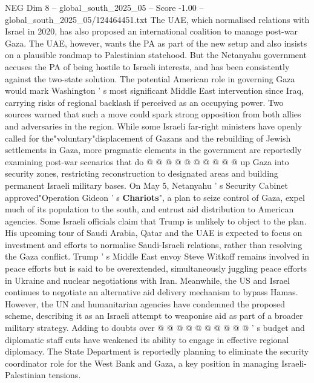 \begin{textsample}{NEG Dim 8 – global\_south\_2025\_05 – Score -1.00 – global\_south\_2025\_05/124464451.txt}
The UAE, which normalised relations with Israel in 2020, has also proposed an international coalition to manage post-war Gaza.
The UAE, however, wants the PA as part of the new setup and also insists on a plausible roadmap to Palestinian statehood.
But the Netanyahu government accuses the PA of being hostile to Israeli interests, and has been consistently against the two-state solution.
The potential American role in governing Gaza would mark Washington ' s most significant Middle East intervention since Iraq, carrying risks of regional backlash if perceived as an occupying power.
Two sources warned that such a move could spark strong opposition from both allies and adversaries in the region.
While some Israeli far-right ministers have openly called for the"voluntary"displacement of Gazans and the rebuilding of Jewish settlements in Gaza, more pragmatic elements in the government are reportedly examining post-war scenarios that do @ @ @ @ @ @ @ @ @ @ up Gaza into security zones, restricting reconstruction to designated areas and building permanent Israeli military bases.
On May 5, Netanyahu ' s Security Cabinet approved"Operation Gideon ' s \textbf{Chariots}", a plan to seize control of Gaza, expel much of its population to the south, and entrust aid distribution to American agencies.
Some Israeli officials claim that Trump is unlikely to object to the plan.
His upcoming tour of Saudi Arabia, Qatar and the UAE is expected to focus on investment and efforts to normalise Saudi-Israeli relations, rather than resolving the Gaza conflict.
Trump ' s Middle East envoy Steve Witkoff remains involved in peace efforts but is said to be overextended, simultaneously juggling peace efforts in Ukraine and nuclear negotiations with Iran.
Meanwhile, the US and Israel continues to negotiate an alternative aid delivery mechanism to bypass Hamas.
However, the UN and humanitarian agencies have condemned the proposed scheme, describing it as an Israeli attempt to weaponise aid as part of a broader military strategy.
Adding to doubts over @ @ @ @ @ @ @ @ @ @ ' s budget and diplomatic staff cuts have weakened its ability to engage in effective regional diplomacy.
The State Department is reportedly planning to eliminate the security coordinator role for the West Bank and Gaza, a key position in managing Israeli-Palestinian tensions.

\end{textsample}
